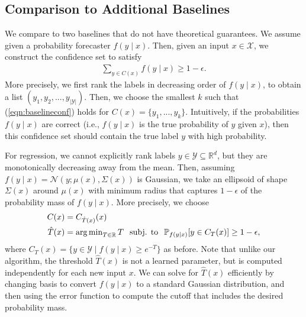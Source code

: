 \documentclass{article} \usepackage{iclr2020_conference,times}
\renewcommand{\(}						{\left(}
\renewcommand{\)}						{\right)}
\renewcommand{\[}						{\left[}
\renewcommand{\]}						{\right]}
\newcommand{\<}						{\left<}
\renewcommand{\>}						{\right>}
\begin{document}
\subsection{Comparison to Additional Baselines}

We compare to two baselines that do not have theoretical guarantees. We assume given a probability forecaster $f(y\mid x)$. Then, given an input $x\in\mathcal{X}$, we construct the confidence set to satisfy
\begin{align}
\label{eqn:baselineconf}
\sum_{y \in C(x)} f(y \mid x) \geq 1 - \epsilon.
\end{align}
More precisely, we first rank the labels in decreasing order of $f(y\mid x)$, to obtain a list $(y_1,y_2,...,y_{|\mathcal{Y}|})$. Then, we choose the smallest $k$ such that (\ref{eqn:baselineconf}) holds for $C(x)=\{y_1,...,y_k\}$. Intuitively, if the probabilities $f(y\mid x)$ are correct (i.e., $f(y\mid x)$ is the true probability of $y$ given $x$), then this confidence set should contain the true label $y$ with high probability.

For regression, we cannot explicitly rank labels $y\in\mathcal{Y}\subseteq\mathbb{R}^{d}$, but they are monotonically decreasing away from the mean. Then, assuming $f(y\mid x)=\mathcal{N}(y;\mu(x),\Sigma(x))$ is Gaussian, we take an ellipsoid of shape $\Sigma(x)$ around $\mu(x)$ with minimum radius that captures $1-\epsilon$ of the probability mass of $f(y\mid x)$. More precisely, we choose
\begin{align*}
C(x)&=C_{\hat T(x)}(x) \\
\hat T(x)&=\operatorname{\arg\min}_{T\in\mathbb{R}}T\hspace{0.1in}\text{subj. to}\hspace{0.1in}\mathbb{P}_{f(y\mid x)}[y\in C_T(x)]\ge1-\epsilon,
\end{align*}
where
$C_T(x)=\{y\in\mathcal{Y}\mid f(y\mid x)\ge e^{-T}\}$ as before. Note that unlike our algorithm, the threshold $\hat T(x)$ is not a learned parameter, but is computed independently for each new input $x$. We can solve for $\hat T(x)$ efficiently by changing basis to convert $f(y\mid x)$ to a standard Gaussian distribution, and then using the error function to compute the cutoff that includes the desired probability mass.
\end{document}
